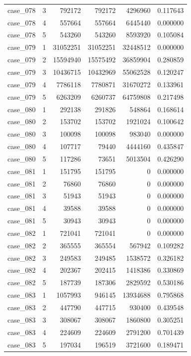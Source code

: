 \begin{longtable}{lrrrrr}
case\_078 & 3 & 792172 & 792172 & 4296960 & 0.117643 \\
case\_078 & 4 & 557664 & 557664 & 6445440 & 0.000000 \\
case\_078 & 5 & 543260 & 543260 & 8593920 & 0.105084 \\
case\_079 & 1 & 31052251 & 31052251 & 32448512 & 0.000000 \\
case\_079 & 2 & 15594940 & 15575492 & 36859904 & 0.280859 \\
case\_079 & 3 & 10436715 & 10432969 & 55062528 & 0.120247 \\
case\_079 & 4 & 7786118 & 7780871 & 31670272 & 0.133961 \\
case\_079 & 5 & 6263209 & 6260737 & 64759808 & 0.217498 \\
case\_080 & 1 & 292138 & 291826 & 548864 & 0.168614 \\
case\_080 & 2 & 153702 & 153702 & 1921024 & 0.100642 \\
case\_080 & 3 & 100098 & 100098 & 983040 & 0.000000 \\
case\_080 & 4 & 107717 & 79440 & 4444160 & 0.435847 \\
case\_080 & 5 & 117286 & 73651 & 5013504 & 0.426290 \\
case\_081 & 1 & 151795 & 151795 & 0 & 0.000000 \\
case\_081 & 2 & 76860 & 76860 & 0 & 0.000000 \\
case\_081 & 3 & 51943 & 51943 & 0 & 0.000000 \\
case\_081 & 4 & 39588 & 39588 & 0 & 0.000000 \\
case\_081 & 5 & 30943 & 30943 & 0 & 0.000000 \\
case\_082 & 1 & 721041 & 721041 & 0 & 0.000000 \\
case\_082 & 2 & 365555 & 365554 & 567942 & 0.109282 \\
case\_082 & 3 & 249583 & 249485 & 1538572 & 0.326182 \\
case\_082 & 4 & 202367 & 202415 & 1418386 & 0.330869 \\
case\_082 & 5 & 187739 & 187306 & 2829592 & 0.530186 \\
case\_083 & 1 & 1057993 & 946145 & 13934688 & 0.795868 \\
case\_083 & 2 & 447790 & 447715 & 930400 & 0.439548 \\
case\_083 & 3 & 308067 & 308067 & 1860800 & 0.305251 \\
case\_083 & 4 & 224609 & 224609 & 2791200 & 0.701439 \\
case\_083 & 5 & 197034 & 196519 & 3721600 & 0.189471 \\

\end{longtable}
